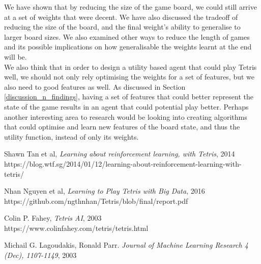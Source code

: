 \documentclass[a4paper,12pt,twocolumn]{article}
\begin{document}
We have shown that by reducing the size of the game board, we could still arrive at
a set of weights that were decent. We have also discussed the tradeoff of reducing
the size of the board, and the final weight's ability to generalise to larger
board sizes. We also examined other ways to reduce the length of games and its
possible implications on how generalisable the weights learnt at the end will be.\\

We also think that in order to design a utility based agent that could play Tetris well,
we should not only rely optimising the weights for a set of features, but we also
need to good features as well. As discussed in Section \ref{discussion_n_findings},
having a set of features that could better represent the state of the game results
in an agent that could potential play better. Perhaps another interesting area
to research would be looking into creating algorithms that could optimise and
learn new features of the board state, and thus the utility function, instead
of only its weights.

\begin{thebibliography}{9}
    Shawn Tan et al, \textit{Learning about reinforcement learning, with Tetris}, 2014\\https://blog.wtf.sg/2014/01/12/learning-about-reinforcement-learning-with-tetris/

    Nhan Nguyen et al, \textit{Learning to Play Tetris with Big Data}, 2016\\https://github.com/ngthnhan/Tetris/blob/final/report.pdf

    Colin P. Fahey, \textit{Tetris AI}, 2003\\https://www.colinfahey.com/tetris/tetris.html
    
    Michail G. Lagoudakis, Ronald Parr.
    \textit{Journal of Machine Learning Research 4 (Dec), 1107-1149}, 2003
\end{thebibliography}
\end{document}
